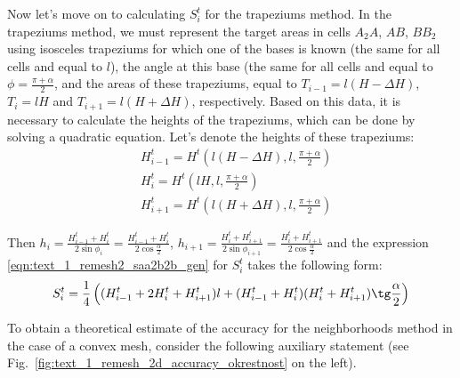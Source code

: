 \documentclass[
11pt,%
tightenlines,%
twoside,%
onecolumn,%
nofloats,%
nobibnotes,%
nofootinbib,%
superscriptaddress,%
noshowpacs,%
centertags]%
{revtex4}
\begin{document}
Now let's move on to calculating $S_i^t$ for the trapeziums method.
In the trapeziums method, we must represent the target areas in cells $A_2A$, $AB$, $BB_2$ using isosceles trapeziums for which one of the bases is known (the same for all cells and equal to $l$), the angle at this base (the same for all cells and equal to $\phi = \frac{\pi + \alpha}{2}$, and the areas of these trapeziums, equal to $T_{i - 1} = l(H - \Delta H)$, $T_i = lH$ and $T_{i + 1} = l(H + \Delta H)$, respectively.
Based on this data, it is necessary to calculate the heights of the trapeziums, which can be done by solving a quadratic equation.
Let's denote the heights of these trapeziums:
\begin{equation}
	\begin{aligned}\label{eqn:text_1_remesh_2_Ht_vypukl}
		& H_{i - 1}^t = H^t\left(l(H - \Delta H), l, \frac{\pi + \alpha}{2}\right) \\ 
		& H_i^t = H^t\left(lH, l, \frac{\pi + \alpha}{2}\right) \\
		& H_{i + 1}^t = H^t\left(l(H + \Delta H), l, \frac{\pi + \alpha}{2}\right)
	\end{aligned}
\end{equation}

Then $h_i = \frac{H_{i - 1}^t + H_i^t}{2 \sin \phi_i} = \frac{H_{i - 1}^t + H_i^t}{2 \cos \frac{\alpha}{2}}$, $h_{i+1} = \frac{H_i^t + H_{i+1}^t}{2 \sin \phi_{i + 1}} = \frac{H_i^t + H_{i+1}^t}{2 \cos \frac{\alpha}{2}}$ and the expression \eqref{eqn:text_1_remesh2_saa2b2b_gen} for $S_i^t$ takes the following form:
\begin{equation}\label{eqn:text_1_remesh2_trap}
	S_i^t = \frac{1}{4} \left( (H_{i - 1}^t + 2 H_i^t + H_{i + 1}^t)l + (H_{i - 1}^t + H_i^t) (H_i^t + H_{i+1}^t) \tg \frac{\alpha}{2} \right)
\end{equation}

To obtain a theoretical estimate of the accuracy for the neighborhoods method in the case of a convex mesh, consider the following auxiliary statement (see Fig.~\ref{fig:text_1_remesh_2d_accuracy_okrestnost} on the left).
\end{document}
